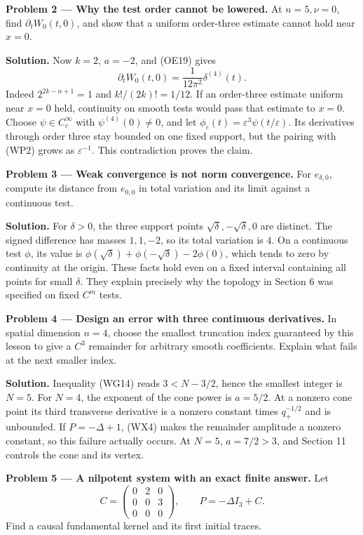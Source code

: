 \documentclass[
  11pt,
]{article}
\begin{document}
\textbf{Problem 2 --- Why the test order cannot be lowered.} At
\(n=5,\nu=0\), find \(\partial_tW_0(t,0)\), and show that a uniform
order-three estimate cannot hold near \(x=0\).

\textbf{Solution.} Now \(k=2\), \(a=-2\), and (OE19) gives \[
                       \partial_tW_0(t,0)=\frac1{12\pi^2}\delta^{(4)}(t).
 \tag{WP2}
\] Indeed \(2^{2k-n+1}=1\) and \(k!/(2k)!=1/12\). If an order-three
estimate uniform near \(x=0\) held, continuity on smooth tests would
pass that estimate to \(x=0\). Choose \(\psi\in C_c^\infty\) with
\(\psi^{(4)}(0)\ne0\), and let
\(\phi_\varepsilon(t)=\varepsilon^3\psi(t/\varepsilon)\). Its
derivatives through order three stay bounded on one fixed support, but
the pairing with (WP2) grows as \(\varepsilon^{-1}\). This contradiction
proves the claim.

\textbf{Problem 3 --- Weak convergence is not norm convergence.} For
\(e_{\delta,0}\), compute its distance from \(e_{0,0}\) in total
variation and its limit against a continuous test.

\textbf{Solution.} For \(\delta>0\), the three support points
\(\sqrt\delta,-\sqrt\delta,0\) are distinct. The signed difference has
masses \(1,1,-2\), so its total variation is \(4\). On a continuous test
\(\phi\), its value is
\(\phi(\sqrt\delta)+\phi(-\sqrt\delta)-2\phi(0)\), which tends to zero
by continuity at the origin. These facts hold even on a fixed interval
containing all points for small \(\delta\). They explain precisely why
the topology in Section 6 was specified on fixed \(C^m\) tests.

\textbf{Problem 4 --- Design an error with three continuous
derivatives.} In spatial dimension \(n=4\), choose the smallest
truncation index guaranteed by this lesson to give a \(C^3\) remainder
for arbitrary smooth coefficients. Explain what fails at the next
smaller index.

\textbf{Solution.} Inequality (WG14) reads \(3<N-3/2\), hence the
smallest integer is \(N=5\). For \(N=4\), the exponent of the cone power
is \(a=5/2\). At a nonzero cone point its third transverse derivative is
a nonzero constant times \(q_+^{-1/2}\) and is unbounded. If
\(P=-\Delta+1\), (WX4) makes the remainder amplitude a nonzero constant,
so this failure actually occurs. At \(N=5\), \(a=7/2>3\), and Section 11
controls the cone and its vertex.

\textbf{Problem 5 --- A nilpotent system with an exact finite answer.}
Let \[
 C=\begin{pmatrix}0&2&0\\0&0&3\\0&0&0\end{pmatrix},
 \qquad P=-\Delta I_3+C.
 \tag{WP3}
\] Find a causal fundamental kernel and its first initial traces.
\end{document}
